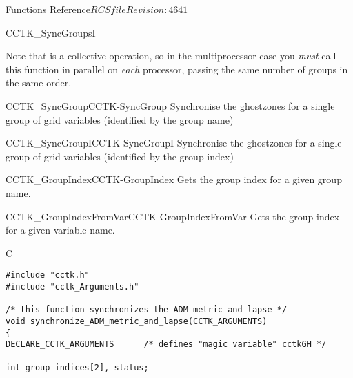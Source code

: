 \begin{cactuspart}{ Functions Reference}{$RCSfile$}{$Revision: 4641 $}
\begin{FunctionDescription}{CCTK\_SyncGroupsI}
\begin{Discussion}
Note that  is a collective operation, so in the
multiprocessor case you {\em must\/} call this function in parallel on
{\em each\/} processor, passing the same number of groups in the same order.
\end{Discussion}

\begin{SeeAlsoSection}
\begin{SeeAlso2}{CCTK\_SyncGroup}{CCTK-SyncGroup}
Synchronise the ghostzones for a single group of grid variables
(identified by the group name)
\end{SeeAlso2}
\begin{SeeAlso2}{CCTK\_SyncGroupI}{CCTK-SyncGroupI}
Synchronise the ghostzones for a single group of grid variables
(identified by the group index)
\end{SeeAlso2}
\begin{SeeAlso2}{CCTK\_GroupIndex}{CCTK-GroupIndex}
Gets the group index for a given group name.
\end{SeeAlso2}
\begin{SeeAlso2}{CCTK\_GroupIndexFromVar}{CCTK-GroupIndexFromVar}
Gets the group index for a given variable name.
\end{SeeAlso2}
\end{SeeAlsoSection}


\begin{ExampleSection}
\begin{Example}{C}
\begin{verbatim}
#include "cctk.h"
#include "cctk_Arguments.h"

/* this function synchronizes the ADM metric and lapse */
void synchronize_ADM_metric_and_lapse(CCTK_ARGUMENTS)
{
DECLARE_CCTK_ARGUMENTS      /* defines "magic variable" cctkGH */

int group_indices[2], status;


\end{verbatim}
\end{Example}
\end{ExampleSection}
\end{FunctionDescription}
\end{cactuspart}
